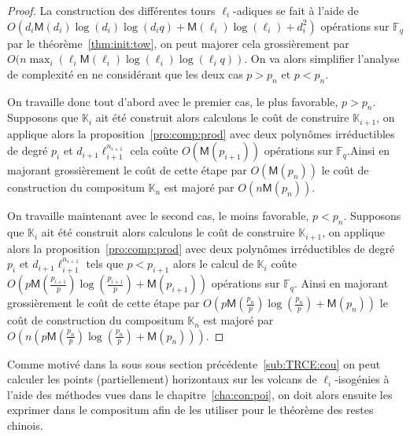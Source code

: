 \documentclass[10pt,a4paper]{book}
\theoremstyle{plain}
\theoremstyle{definition}
\theoremstyle{definition}
\theoremstyle{definition}
\theoremstyle{definition}
\theoremstyle{remark}
\theoremstyle{remark}
\theoremstyle{definition}
\begin{document}
\begin{proof}
La construction des différentes tours $\ell_i$-adiques se fait à l'aide de 
$O(d_i\mathsf{M}(d_i)\log(d_i)\log(d_iq)+\mathsf{M}(\ell_i)\log(\ell_i)+d_i^2)$ 
opérations sur $\mathbb{F}_q$ par le théorème~\ref{thm:init:tow}, on peut 
majorer cela grossièrement par 
$O(n \max_i(\ell_i\mathsf{M}(\ell_i)\log(\ell_i)\log(\ell_iq))$.
On va alors simplifier l'analyse de complexité en ne considérant que les deux 
cas $p>p_n$ et $p<p_n$.

On travaille donc tout d'abord avec le premier cas, le plus favorable, $p>p_n$.
Supposons que $\mathbb{K}_i$ ait été construit alors calculons le coût de 
construire $\mathbb{K}_{i+1}$, on applique alors la 
proposition~\ref{pro:comp:prod} avec deux polynômes irréductibles de degré 
$p_i$ et $d_{i+1}\ell_{i+1}^{n_{i+1}}$ cela coûte $O(\mathsf{M}(p_{i+1}))$ 
opérations sur $\mathbb{F}_q$.Ainsi en majorant grossièrement le coût de cette 
étape par $O(\mathsf{M}(p_n))$ le coût de construction du compositum 
$\mathbb{K}_n$ est majoré par $O(n\mathsf{M}(p_n))$.

On travaille maintenant avec le second cas, le moins favorable, $p<p_n$.
Supposons que $\mathbb{K}_i$ ait été construit alors calculons le coût de 
construire $\mathbb{K}_{i+1}$, on applique alors la 
proposition~\ref{pro:comp:prod} avec deux polynômes irréductibles de degré 
$p_i$ et $d_{i+1}\ell_{i+1}^{n_{i+1}}$ tels que $p<p_{i+1}$ alors le calcul de 
$\mathbb{K}_i$ coûte 
$O(p\mathsf{M}(\frac{p_{i+1}}{p})\log(\frac{p_{i+1}}{p})+\mathsf{M}(p_{i+1}))$
opérations sur $\mathbb{F}_q$. Ainsi en majorant grossièrement le coût de cette
étape par $O(p\mathsf{M}(\frac{p_n}{p})\log(\frac{p_n}{p})+\mathsf{M}(p_n))$
le coût de construction du compositum $\mathbb{K}_n$ est majoré par 
$O(n(p\mathsf{M}(\frac{p_n}{p})\log(\frac{p_n}{p})+\mathsf{M}(p_n)))$.
\end{proof}



 Comme motivé dans la sous sous section précédente~\ref{sub:TRCE:cou} on peut 
 calculer les points (partiellement) horizontaux sur les volcans de 
 $\ell_i$-isogénies à l'aide des méthodes vues dans le 
 chapitre~\ref{cha:con:poi}, on doit alors ensuite les exprimer dans le
 compositum afin de les utiliser pour le théorème des restes chinois.
  
\end{document}
